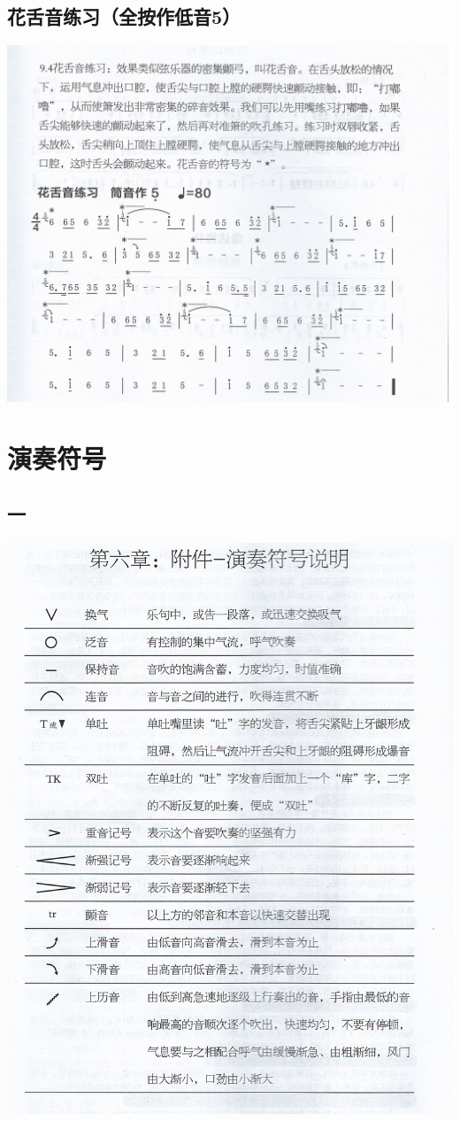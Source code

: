 \documentclass[cn,pad,chinese,chinesefont=nofont]{elegantbook}
\begin{document}
\section{花舌音练习（全按作低音5）}
\includegraphics[width=\textwidth]{dongxiao/Scan 16-2.jpeg}

\chapter{演奏符号}
\section{一}
\includegraphics[height=0.8\textheight]{dongxiao/Scan 24.jpeg}
\end{document}
